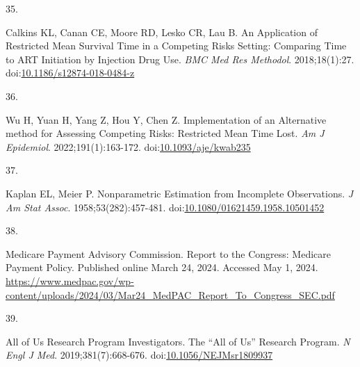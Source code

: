 \documentclass[
  12pt,
  number]{elsarticle}
\newlength{\cslhangindent}
\newlength{\csllabelwidth}
\newenvironment{CSLReferences}[2] %
 {\begin{list}{}{%
  \setlength{\itemindent}{0pt}
  \setlength{\leftmargin}{0pt}
  \setlength{\parsep}{0pt}
  \ifodd #1
   \setlength{\leftmargin}{\cslhangindent}
   \setlength{\itemindent}{-1\cslhangindent}
  \fi
  \setlength{\itemsep}{#2\baselineskip}}}
 {\end{list}}
\newcommand{\CSLLeftMargin}[1]{\parbox[t]{\csllabelwidth}{\strut#1\strut}}
\newcommand{\CSLRightInline}[1]{\parbox[t]{\linewidth - \csllabelwidth}{\strut#1\strut}}
\begin{document}
\begin{CSLReferences}{0}{1}
\CSLLeftMargin{35. }%
\CSLRightInline{Calkins KL, Canan CE, Moore RD, Lesko CR, Lau B. {An
Application of Restricted Mean Survival Time in a Competing Risks
Setting: Comparing Time to ART Initiation by Injection Drug Use}.
\emph{BMC Med Res Methodol}. 2018;18(1):27.
doi:\href{https://doi.org/10.1186/s12874-018-0484-z}{10.1186/s12874-018-0484-z}}

\CSLLeftMargin{36. }%
\CSLRightInline{Wu H, Yuan H, Yang Z, Hou Y, Chen Z. {Implementation of
an Alternative method for Assessing Competing Risks: Restricted Mean
Time Lost}. \emph{Am J Epidemiol}. 2022;191(1):163-172.
doi:\href{https://doi.org/10.1093/aje/kwab235}{10.1093/aje/kwab235}}

\CSLLeftMargin{37. }%
\CSLRightInline{Kaplan EL, Meier P. {Nonparametric Estimation from
Incomplete Observations}. \emph{J Am Stat Assoc}. 1958;53(282):457-481.
doi:\href{https://doi.org/10.1080/01621459.1958.10501452}{10.1080/01621459.1958.10501452}}

\CSLLeftMargin{38. }%
\CSLRightInline{Medicare Payment Advisory Commission. {Report to the
Congress: Medicare Payment Policy}. Published online March 24, 2024.
Accessed May 1, 2024.
\url{https://www.medpac.gov/wp-content/uploads/2024/03/Mar24_MedPAC_Report_To_Congress_SEC.pdf}}

\CSLLeftMargin{39. }%
\CSLRightInline{All of Us Research Program Investigators. {The {``All of
Us''} Research Program}. \emph{N Engl J Med}. 2019;381(7):668-676.
doi:\href{https://doi.org/10.1056/NEJMsr1809937}{10.1056/NEJMsr1809937}}

\end{CSLReferences}
\end{document}
